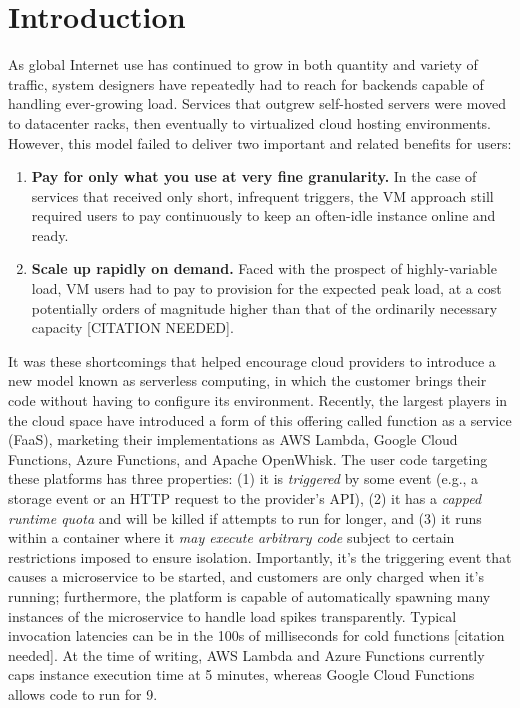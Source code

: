 \section{Introduction}
\label{sec:intro}

As global Internet use has continued to grow in both quantity and variety of traffic, system designers have repeatedly had to reach for backends capable of handling ever-growing load.
Services that outgrew self-hosted servers were moved to datacenter racks, then eventually to virtualized cloud hosting environments.
However, this model failed to deliver two important and related benefits for users:
\begin{enumerate}
\item \textbf{Pay for only what you use at very fine granularity.} In the case of services that received only short, infrequent triggers, the VM approach still required users to pay continuously to keep an often-idle instance online and ready.
\item \textbf{Scale up rapidly on demand.} Faced with the prospect of highly-variable load, VM users had to pay to provision for the expected peak load, at a cost potentially orders of magnitude higher than that of the ordinarily necessary capacity [CITATION NEEDED].
\end{enumerate}

It was these shortcomings that helped encourage cloud providers to introduce a new model known as serverless computing, in which the customer brings their code without having to configure its environment.
Recently, the largest players in the cloud space have introduced a form of this offering called function as a service (FaaS), marketing their implementations as AWS Lambda, Google Cloud Functions, Azure Functions, and Apache OpenWhisk.
The user code targeting these platforms has three properties: (1) it is \textit{triggered} by some event (e.g., a storage event or an HTTP request to the provider's API), (2) it has a \textit{capped runtime quota} and will be killed if attempts to run for longer, and (3) it runs within a container where it \textit{may execute arbitrary code} subject to certain restrictions imposed to ensure isolation.
Importantly, it's the triggering event that causes a microservice to be started, and customers are only charged when it's running; furthermore, the platform is capable of automatically spawning many instances of the microservice to handle load spikes transparently.
Typical invocation latencies can be in the 100s of milliseconds for cold functions [citation needed].
At the time of writing, AWS Lambda and Azure Functions currently caps instance execution time at 5 minutes, whereas Google Cloud Functions allows code to run for 9.

